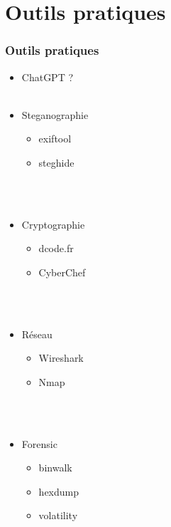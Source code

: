 \documentclass{beamer}
\begin{document}
\section{Outils pratiques}

\begin{frame}
\frametitle{Outils pratiques}

\begin{multicols}{2}

\begin{itemize}
    \item ChatGPT ?
    \\~\\
    \item Steganographie
    \begin{itemize}
        \item exiftool
        \item steghide
    \end{itemize}
    \\~\\
    \item Cryptographie
    \begin{itemize}
        \item dcode.fr
        \item CyberChef
    \end{itemize}
    \\~\\
    \item Réseau
    \begin{itemize}
        \item Wireshark
        \item Nmap
    \end{itemize}

    \\~\\
    
    \item Forensic
    \begin{itemize}
        \item binwalk
        \item hexdump
        \item volatility
    \end{itemize}

    \\~\\
    

\end{itemize}
\end{multicols}
\end{frame}
\end{document}
